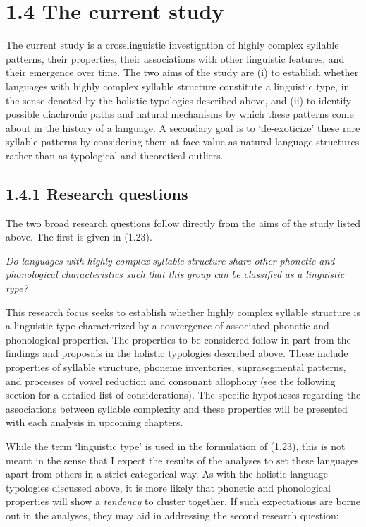 \section{1.4 The current study}

  The current study is a crosslinguistic investigation of highly complex syllable patterns, their properties, their associations with other linguistic features, and their emergence over time. The two aims of the study are (i) to establish whether languages with highly complex syllable structure constitute a linguistic type, in the sense denoted by the holistic typologies described above, and (ii) to identify possible diachronic paths and natural mechanisms by which these patterns come about in the history of a language. A secondary goal is to ‘de-exoticize’ these rare syllable patterns by considering them at face value as natural language structures rather than as typological and theoretical outliers.

\subsection{1.4.1 Research questions}

  The two broad research questions follow directly from the aims of the study listed above. The first is given in (1.23).

\ea\label{ex:(1.23)}
   \textit{Do} \textit{languages} \textit{with} \textit{highly} \textit{complex} \textit{syllable} \textit{structure} \textit{share} \textit{other} \textit{phonetic} \textit{and} \textit{phonological} \textit{characteristics} \textit{such} \textit{that} \textit{this} \textit{group} \textit{can} \textit{be} \textit{classified} \textit{as} \textit{a} \textit{linguistic} \textit{type?}
\z

  This research focus seeks to establish whether highly complex syllable structure is a linguistic type characterized by a convergence of associated phonetic and phonological properties. The properties to be considered follow in part from the findings and proposals in the holistic typologies described above. These include properties of syllable structure, phoneme inventories, suprasegmental patterns, and processes of vowel reduction and consonant allophony (see the following section for a detailed list of considerations). The specific hypotheses regarding the associations between syllable complexity and these properties will be presented with each analysis in upcoming chapters.

  While the term ‘linguistic type’ is used in the formulation of (1.23), this is not meant in the sense that I expect the results of the analyses to set these languages apart from others in a strict categorical way. As with the holistic language typologies discussed above, it is more likely that phonetic and phonological properties will show a \textit{tendency} to cluster together. If such expectations are borne out in the analyses, they may aid in addressing the second research question:

